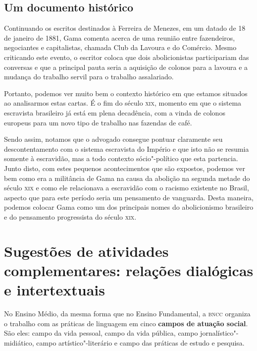 \documentclass[12pt]{extarticle}
\begin{document}
\subsection{Um documento histórico}

Continuando os escritos destinados à Ferreira de Menezes, em um datado
de 18 de janeiro de 1881, Gama comenta acerca de uma reunião entre
fazendeiros, negociantes e capitalistas, chamada Club da Lavoura e do
Comércio. Mesmo criticando este evento, o escritor coloca que dois
abolicionistas participariam das conversas e que a principal pauta seria
a aquisição de colonos para a lavoura e a mudança do trabalho servil
para o trabalho assalariado.

Portanto, podemos ver muito bem o contexto histórico em que estamos
situados ao analisarmos estas cartas. É o fim do século \textsc{xix}, momento em
que o sistema escravista brasileiro já está em plena decadência, com a
vinda de colonos europeus para um novo tipo de trabalho nas fazendas de
café.

Sendo assim, notamos que o advogado consegue pontuar claramente seu
descontentamento com o sistema escravista do Império e que isto não se
resumia somente à escravidão, mas a todo contexto sócio"-político que
esta partencia. Junto disto, com estes pequenos acontecimentos que são
expostos, podemos ver bem como era a militância de Gama na causa da
abolição na segunda metade do século \textsc{xix} e como ele relacionava a
escravidão com o racismo existente no Brasil, aspecto que para este
período seria um pensamento de vanguarda. Desta maneira, podemos colocar
Gama como um dos principais nomes do abolicionismo brasileiro e do
pensamento progressista do século \textsc{xix}.




\section{Sugestões de atividades complementares: relações dialógicas e
intertextuais}


No Ensino Médio, da mesma forma que no Ensino Fundamental, a \textsc{bncc}
organiza o trabalho com as práticas de linguagem em cinco \textbf{campos
de atuação social}. São eles: campo da vida pessoal, campo da vida
pública, campo jornalístico"-midiático, campo artístico"-literário e campo
das práticas de estudo e pesquisa.
\end{document}
